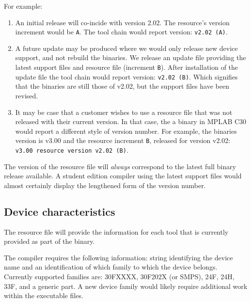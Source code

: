 \documentclass{article}
\begin{document}
  For example: 
  \begin{enumerate} 
    \item An initial release will co-incide with version 2.02. 
          The resource's version increment would be \texttt{A}.
          The tool chain would report version: \texttt{v2.02 (A)}.  

    \item A future update may be produced where we would only release
          new device support, and not rebuild the binaries.  We release
          an update file providing the latest support files and resource
          file (increment \texttt{B}).  After installation of the update file
          the tool chain would report version: \texttt{v2.02 (B)}.  Which 
          signifies that the binaries are still those of v2.02, but the 
          support files have been revised.

    \item It may be case that a customer wishes to use a resource file
          that was not released with their current version.  In that case,
\chgbarbegin
          the a binary in MPLAB C30 would report a different style of version
           number.
\chgbarend
          For example, the binaries version is v3.00 and the resource 
          increment \texttt{B}, released for version v2.02:
          \texttt{v3.00 resource version v2.02 (B)}.
  \end{enumerate}

\chgbarbegin
  The version of the resource file will \textit{always} correspond to the
  latest full binary release available.  A student edition compiler using the
  latest support files would almost certainly display the lengthened form of
  the version number.
\chgbarend
 

\subsection{Device characteristics}
 
  The resource file will provide the information for each tool that is currently
  provided as part of the binary.
  
  The compiler requires the following information:  string identifying the
  device name and an identification of which family to which the device 
  belongs.  Currently supported families are: 30FXXXX, 30F202X (or SMPS),
  24F, 24H, 33F, and a generic part.  A new device family would likely require
  additional work within the executable files.
\end{document}
